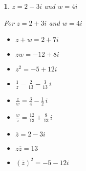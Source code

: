 \documentclass{amsbook}
\newtheorem{exc}{}
\newenvironment{ex}{\begin{exc}\normalfont}{\end{exc}}
\numberwithin{section}{chapter}
\numberwithin{equation}{chapter}
\begin{document}
\begin{ex}
	$z = 2+3i$ and $w = 4i$
	\begin{sol}
		For $z = 2+3i$ and $w = 4i$
		
		\begin{multicols}{3}
			
			\begin{itemize}
				
				\item $z+w = 2+7i$
				
				\item $zw = -12+8i$
				
				\item $z^2 = -5 + 12i$
				
			\end{itemize}
			
		\end{multicols}
		
		\begin{multicols}{3}
			
			\begin{itemize}
				
				\item $\frac{1}{z} = \frac{2}{13} - \frac{3}{13} \, i$
				
				\item $\frac{z}{w} = \frac{3}{4} - \frac{1}{2} \, i$
				
				\item $\frac{w}{z} = \frac{12}{13} + \frac{8}{13} \,i$
				
			\end{itemize}
			
		\end{multicols}
		
		\begin{multicols}{3}
			
			\begin{itemize}
				
				\item $\overline{z} = 2-3i$
				
				\item $z\overline{z} = 13$
				
				\item $(\overline{z})^2 = -5-12i$
				
			\end{itemize}
			
		\end{multicols}
	\end{sol}
\end{ex}
\end{document}
